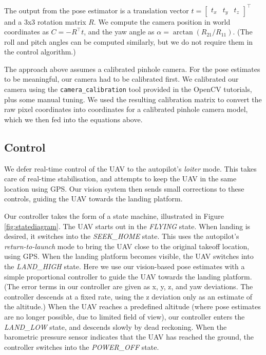 \documentclass[10pt]{scrartcl} %
\begin{document}
The output from the pose estimator is a translation vector
$t = \begin{bmatrix} t_x & t_y & t_z \end{bmatrix}^\top$
and a 3x3 rotation matrix $R$. We compute the camera position in world
coordinates as $C = -R^\top t$, and the yaw angle as
$\alpha = \arctan(R_{21} / R_{11})$. (The roll and pitch angles can be computed
similarly, but we do not require them in the control algorithm.)

The approach above assumes a calibrated pinhole camera. For the pose estimates
to be meaningful, our camera had to be calibrated first. We calibrated our
camera using the {\tt camera\_calibration} tool provided in the OpenCV
tutorials, plus some manual tuning. We used the resulting calibration matrix to
convert the raw pixel coordinates into coordinates for a calibrated pinhole
camera model, which we then fed into the equations above.


\subsection{Control}

We defer real-time control of the UAV to the autopilot's \textit{loiter} mode.
This takes care of real-time stabilisation, and attempts to keep the UAV in the
same location using GPS. Our vision system then sends small corrections to
these controls, guiding the UAV towards the landing platform.


Our controller takes the form of a state machine, illustrated in Figure
\ref{fig:statediagram}. The UAV starts out in the \textit{FLYING} state. When
landing is desired, it switches into the \textit{SEEK\_HOME} state. This uses
the autopilot's \textit{return-to-launch} mode to bring the UAV close to the
original takeoff location, using GPS. When the landing platform becomes
visible, the UAV switches into the \textit{LAND\_HIGH} state. Here we use our
vision-based pose estimates with a simple proportional controller to guide the
UAV towards the landing platform. (The error terms in our controller are given
as x, y, z, and yaw deviations. The controller descends at a fixed rate, using
the z deviation only as an estimate of the altitude.) When the UAV reaches a
predefined altitude (where pose estimates are no longer possible, due to
limited field of view), our controller enters the \textit{LAND\_LOW} state, and
descends slowly by dead reckoning. When the barometric pressure sensor indicates
that the UAV has reached the ground, the controller switches into the
\textit{POWER\_OFF} state.
\end{document}
